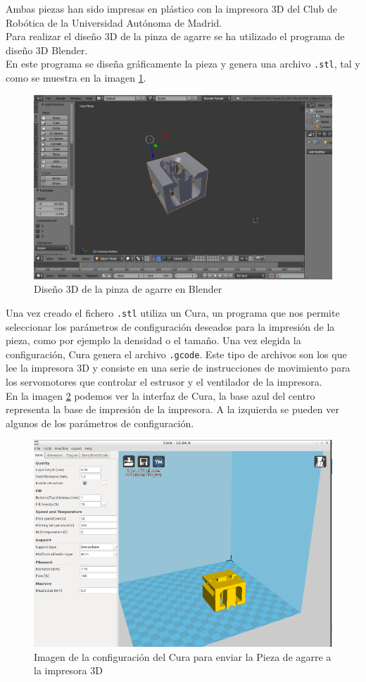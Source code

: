 \documentclass[twoside, 11pt]{epstfg}
\begin{document}
Ambas piezas han sido impresas en plástico con la impresora 3D del Club de Robótica de la Universidad Autónoma de Madrid.\\
Para realizar el diseño 3D de la pinza de agarre se ha utilizado el programa de diseño 3D Blender.\\
En este programa se diseña gráficamente la pieza y genera una archivo \texttt{.stl}, tal y como se muestra en la imagen \ref{fig::blender}. 
\begin{figure}[H]
	\centerline{
		\mbox{\includegraphics[width=.80\textwidth]{images/cameraBlender.png}}
	}
	\caption{ Diseño 3D de la pinza de agarre en Blender}
	\label{fig::blender}
\end{figure}

Una vez creado el fichero \texttt{.stl} utiliza un Cura, un programa que nos permite seleccionar los parámetros de configuración deseados para la impresión de la pieza, como por ejemplo la densidad o el tamaño. Una vez elegida la configuración, Cura genera el archivo \texttt{.gcode}. Este tipo de archivos son los que lee la impresora 3D y consiste en una serie de instrucciones de movimiento para los servomotores que controlar el estrusor y el ventilador de la impresora.\\
En la imagen \ref{Cura} podemos ver la interfaz de Cura, la base azul del centro representa la base de impresión de la impresora. A la izquierda se pueden ver algunos de los parámetros de configuración.

\begin{figure}[H]
	\centerline{
		\mbox{\includegraphics[width=.75\textwidth]{images/Cura2.png}}
	}
	\caption{Imagen de la configuración del Cura para enviar la Pieza de agarre a la impresora 3D}
	\label{Cura}
\end{figure}
 
\end{document}
